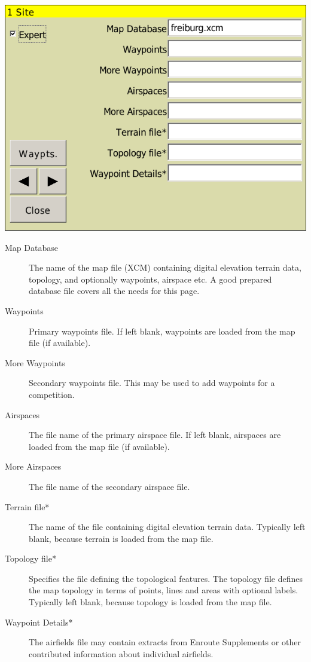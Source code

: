 \documentclass[a4paper,12pt]{refrep}
\begin{document}
\begin{center}
\includegraphics[angle=0,width=\linewidth,keepaspectratio='true']{figures/config-site.png}
\end{center}

\begin{description}
\item[Map Database]  The name of the map file (XCM) containing digital elevation
  terrain data, topology, and optionally waypoints, airspace etc. A good
  prepared database file covers all the needs for this page.
\item[Waypoints]  Primary waypoints file.  If left blank, waypoints are loaded
from the map file (if available).
\item[More Waypoints]  Secondary waypoints file.  This may be used to add waypoints for a competition.
\item[Airspaces]  The file name of the primary airspace file.  If left blank,
airspaces are loaded from the map file (if available).
\item[More Airspaces]  The file name of the secondary airspace file.
\item[Terrain file*]  The name of the file containing digital elevation
  terrain data.  Typically left blank, because terrain is loaded from the map
  file.
\item[Topology file*]  Specifies the file defining the topological features.
The topology file defines the map topology in terms of points, lines
and areas with optional labels.  Typically left blank, because topology is
loaded from the map file.
\item[Waypoint Details*]  The airfields file may contain extracts from Enroute Supplements or
other contributed information about individual airfields.
\end{description}
\end{document}

